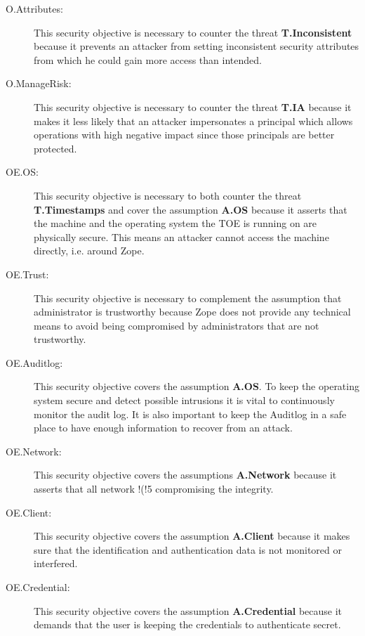 \documentclass[12pt,english]{scrbook}
\begin{document}
\begin{description}
  \item[O.Attributes:] This security objective is necessary to counter the
    threat \textbf{T.Inconsistent} because it prevents an attacker from
    setting inconsistent security attributes from which he could gain more
    access than intended.

  \item[O.ManageRisk:] This security objective is necessary to counter the
  threat \textbf{T.IA} because it makes it less likely that an attacker
  impersonates a principal which allows operations with high negative impact
  since those principals are better protected.

  \item[OE.OS:] This security objective is necessary to both counter the
  threat \textbf{T.Timestamps} and cover the assumption \textbf{A.OS} because
  it asserts that the machine and the operating system the TOE is running on
  are physically secure. This means an attacker cannot access the machine
  directly, i.e. around Zope.

  \item[OE.Trust:] This security objective is necessary to complement the
      assumption that administrator is trustworthy because Zope does not provide any
      technical means to avoid being compromised by administrators that are
      not trustworthy.

  \item[OE.Auditlog:] This security objective covers the assumption
  \textbf{A.OS}. To keep the operating system secure and detect possible
  intrusions it is vital to continuously monitor the audit log. It is also
  important to keep the Auditlog in a safe place to have enough information to
  recover from an attack.

  \item[OE.Network:] This security objective covers the assumptions
  \textbf{A.Network} because it asserts that all
  network !(!5
  compromising the integrity.

  \item[OE.Client:] This security objective covers the assumption
  \textbf{A.Client} because it makes sure that the identification and
  authentication data is not monitored or interfered.

  \item[OE.Credential:] This security objective covers the assumption
  \textbf{A.Credential} because it demands that the user is keeping the
  credentials to authenticate secret.
  
\end{description}
\end{document}
